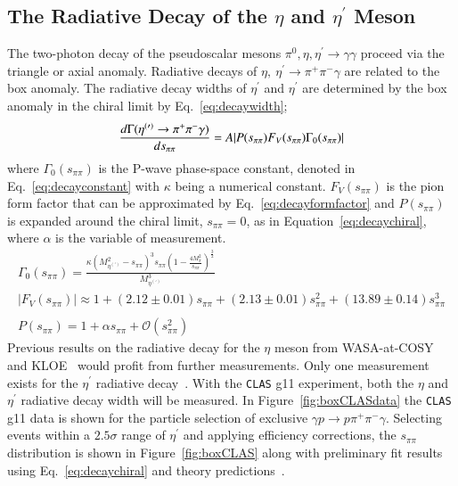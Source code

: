 \documentclass[epj]{webofc}
\begin{document}
\subsection{The Radiative Decay of the $\eta$ and $\eta^\prime$  Meson}
The two-photon decay of the pseudoscalar mesons $\pi^0, \eta , \eta^{\prime} \to \gamma \gamma $ proceed via the triangle or axial anomaly. Radiative decays of  $\eta , \ \eta^{\prime} \to \pi^+ \pi^- \gamma $ are related to the box anomaly. The radiative decay widths of $ \eta^{\prime}$ and $\eta^{\prime}$ are determined by the box anomaly in the chiral limit by 
Eq.~\ref{eq:decaywidth};
\begin{equation}
\frac{d\Gamma (\eta^{(\prime)} \to \pi^+ \pi^- \gamma)}{ds_{\pi\pi}} = A\vert P(s_{\pi\pi}) F_V(s_{\pi\pi}) \Gamma_0(s_{\pi\pi})\vert  \label{eq:decaywidth} \\
\end{equation}
where $\Gamma_0(s_{\pi\pi})$ is the P-wave phase-space constant, denoted in Eq.~\ref{eq:decayconstant} with $\kappa$ being a 
numerical constant. $F_V(s_{\pi\pi})$ is the pion form factor that can be approximated by Eq.~\ref{eq:decayformfactor} and  
$P(s_{\pi\pi})$ is expanded around the chiral limit, $s_{\pi\pi} = 0$, as in Equation~\ref{eq:decaychiral}, where $\alpha$ is the 
variable of measurement.
\begin{eqnarray}
\Gamma_0(s_{\pi\pi}) = \frac{\kappa \left(M^2_{\eta^{(\prime)}} - s_{\pi\pi} \right)^3  s_{\pi\pi} \left(1- \frac{ 4M^2_{\pi }}{    s_{\pi\pi}  }\right)^{\frac{3}{2}}   }{M^3_{\eta^{(\prime)} }}  \label{eq:decayconstant}  \\
\vert F_V(s_{\pi\pi}) \vert \approx 1+(2.12\pm0.01)s_{\pi\pi} + (2.13\pm0.01)s_{\pi\pi}^2+(13.89\pm0.14)s_{\pi\pi}^3 \label{eq:decayformfactor} \\ \nonumber
\\ 
P(s_{\pi\pi}) = 1 + \alpha s_{\pi\pi} + \mathcal{O}(s_{\pi\pi}^2) \label{eq:decaychiral}
\end{eqnarray}
Previous results on the radiative decay for the $\eta$ meson from WASA-at-COSY~\cite{bib0} and KLOE~\cite{bib1} would profit from further measurements. Only one measurement exists for the $\eta^{\prime}$ radiative decay~\cite{bib2}. With the \textsc{\texttt{CLAS}} g11 experiment, both the $\eta$ and  $\eta^{\prime}$ radiative decay width will be measured. In Figure~\ref{fig:boxCLASdata} the \textsc{\texttt{CLAS}} g11 data is shown for the particle selection of exclusive $\gamma p \to p  \pi^+ \pi^- \gamma $. Selecting events within a $2.5 \sigma$ range of $\eta^{\prime}$ and applying efficiency corrections, the $s_{\pi\pi}$ distribution is shown in Figure~\ref{fig:boxCLAS} along with preliminary fit results using Eq.~\ref{eq:decaychiral} and theory predictions~\cite{Kubis2015}.  
\end{document}

